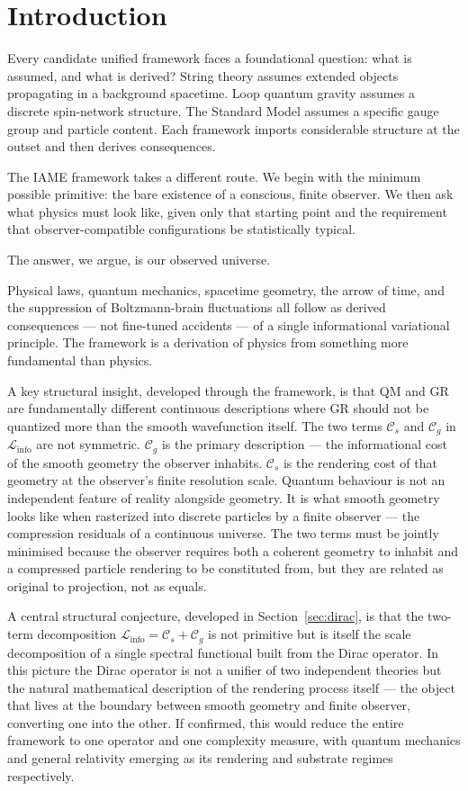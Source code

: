 \documentclass[12pt,a4paper]{article}
\newcommand{\iame}{\textsc{IAME}}
\newcommand{\Linfo}{\mathcal{L}_{\mathrm{info}}}
\newcommand{\Cs}{\mathcal{C}_s}
\newcommand{\Cg}{\mathcal{C}_g}
\begin{document}
\section{Introduction}
\label{sec:intro}

Every candidate unified framework faces a foundational question: what is
assumed, and what is derived? String theory assumes extended objects propagating
in a background spacetime. Loop quantum gravity assumes a discrete spin-network
structure. The Standard Model assumes a specific gauge group and particle
content. Each framework imports considerable structure at the outset and then
derives consequences.

The \iame{} framework takes a different route. We begin with the minimum
possible primitive: the bare existence of a conscious, finite observer. We
then ask what physics must look like, given only that starting point and the
requirement that observer-compatible configurations be statistically typical.

The answer, we argue, is our observed universe.

Physical laws, quantum mechanics, spacetime geometry, the arrow of time,
and the suppression of Boltzmann-brain
fluctuations all follow as derived consequences --- not fine-tuned accidents
--- of a single informational variational principle. The framework is
a derivation of physics from something more fundamental than physics.

A key structural insight, developed through the framework, is that
QM and GR are fundamentally different continuous descriptions where GR
should not be quantized more than the smooth wavefunction itself. The two
terms $\Cs$ and $\Cg$ in $\Linfo$ are not symmetric. $\Cg$ is the primary
description --- the informational cost of the smooth geometry the observer inhabits.
$\Cs$ is the rendering cost of that geometry at the observer's finite
resolution scale. Quantum behaviour is not an independent feature of reality
alongside geometry. It is what smooth geometry looks like when rasterized into
discrete particles by a finite observer --- the compression residuals of a
continuous universe. The two terms must be jointly minimised because the
observer requires both a coherent geometry to
inhabit and a compressed particle rendering to be constituted from, but they
are related as original to projection, not as equals.

A central structural conjecture, developed in Section~\ref{sec:dirac}, is
that the two-term decomposition $\Linfo = \Cs + \Cg$ is not primitive but is
itself the scale decomposition of a single spectral functional built from the
Dirac operator. In this picture the Dirac operator is not a unifier of two
independent theories but the natural mathematical description of the rendering
process itself --- the object that lives at the boundary between smooth
geometry and finite observer, converting one into the other. If confirmed,
this would reduce the entire framework to one operator and one complexity
measure, with quantum mechanics and general relativity emerging as its
rendering and substrate regimes respectively.
\end{document}
